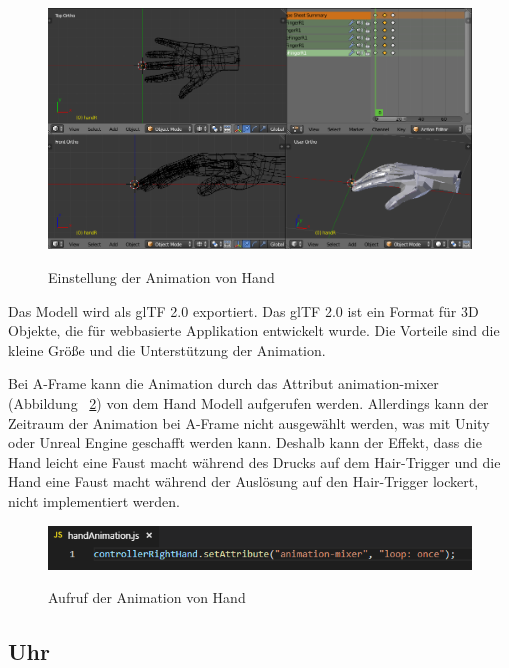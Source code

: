 \begin{figure}[ht]
\vspace*{1em}
\centering
\caption[Einstellung der Animation von Hand]{Einstellung der Animation von Hand}
\includegraphics[width=\textwidth]{images/handKeyframes.png}
\label{fig:handKeyframes} 
\end{figure}
 
 Das Modell wird als glTF 2.0 exportiert. Das glTF 2.0 ist ein Format für 3D Objekte, die für webbasierte Applikation entwickelt wurde. Die Vorteile sind die kleine Größe und die Unterstützung der Animation.
 
 Bei A-Frame kann die Animation durch das Attribut {\selectfont animation-mixer} (Abbildung ~\ref{fig:handAnimation}) von dem Hand Modell aufgerufen werden. Allerdings kann der Zeitraum der Animation bei A-Frame nicht ausgewählt werden, was mit Unity oder Unreal Engine geschafft werden kann. Deshalb kann der Effekt, dass die Hand leicht eine Faust macht während des Drucks auf dem Hair-Trigger und die Hand eine Faust macht während der Auslösung auf den Hair-Trigger lockert, nicht implementiert werden.
 
\begin{figure}[ht]
\vspace*{1em}
\centering
\caption[Aufruf der Animation von Hand]{Aufruf der Animation von Hand}
\includegraphics[width=\textwidth]{images/handAnimation.png}
\label{fig:handAnimation} 
\end{figure}
 
 \subsection{Uhr}
 

